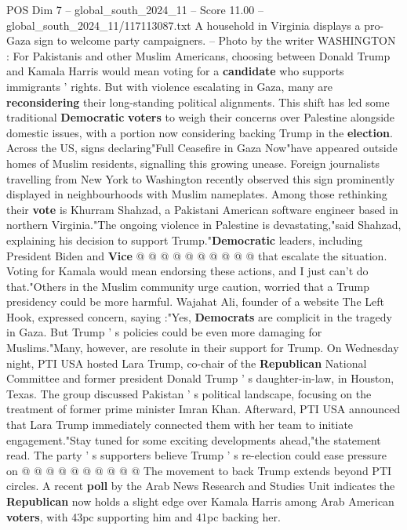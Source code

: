 \begin{textsample}{POS Dim 7 – global\_south\_2024\_11 – Score 11.00 – global\_south\_2024\_11/117113087.txt}  \label{ex:f7_pos_140}
A household in Virginia displays a pro-Gaza sign to welcome party campaigners. -- Photo by the writer WASHINGTON : For Pakistanis and other Muslim Americans, choosing between Donald Trump and Kamala Harris would mean voting for a \textbf{candidate} who supports immigrants ' rights.
But with violence escalating in Gaza, many are \textbf{reconsidering} their long-standing political alignments.
This shift has led some traditional \textbf{Democratic} \textbf{voters} to weigh their concerns over Palestine alongside domestic issues, with a portion now considering backing Trump in the \textbf{election}.
Across the US, signs declaring"Full Ceasefire in Gaza Now"have appeared outside homes of Muslim residents, signalling this growing unease.
Foreign journalists travelling from New York to Washington recently observed this sign prominently displayed in neighbourhoods with Muslim nameplates.
Among those rethinking their \textbf{vote} is Khurram Shahzad, a Pakistani American software engineer based in northern Virginia."The ongoing violence in Palestine is devastating,"said Shahzad, explaining his decision to support Trump."\textbf{Democratic} leaders, including President Biden and \textbf{Vice} @ @ @ @ @ @ @ @ @ @ that escalate the situation.
Voting for Kamala would mean endorsing these actions, and I just can't do that."Others in the Muslim community urge caution, worried that a Trump presidency could be more harmful.
Wajahat Ali, founder of a website The Left Hook, expressed concern, saying :"Yes, \textbf{Democrats} are complicit in the tragedy in Gaza.
But Trump ' s policies could be even more damaging for Muslims."Many, however, are resolute in their support for Trump.
On Wednesday night, PTI USA hosted Lara Trump, co-chair of the \textbf{Republican} National Committee and former president Donald Trump ' s daughter-in-law, in Houston, Texas.
The group discussed Pakistan ' s political landscape, focusing on the treatment of former prime minister Imran Khan.
Afterward, PTI USA announced that Lara Trump immediately connected them with her team to initiate engagement."Stay tuned for some exciting developments ahead,"the statement read.
The party ' s supporters believe Trump ' s re-election could ease pressure on @ @ @ @ @ @ @ @ @ @ The movement to back Trump extends beyond PTI circles.
A recent \textbf{poll} by the Arab News Research and Studies Unit indicates the \textbf{Republican} now holds a slight edge over Kamala Harris among Arab American \textbf{voters}, with 43pc supporting him and 41pc backing her.

\end{textsample}
